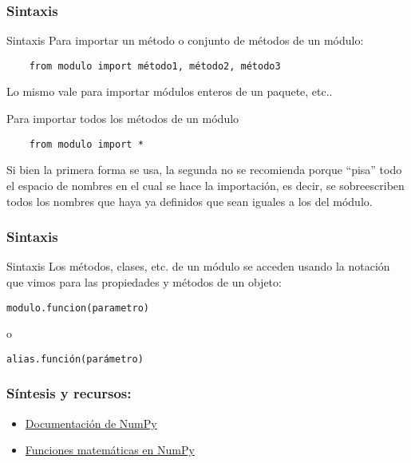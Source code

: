 \documentclass{beamer}
\begin{document}
\begin{frame}[fragile]
    \frametitle{Sintaxis}
    \begin{block}{Sintaxis}
    Para importar un método o conjunto de métodos de un módulo:
    \begin{verbatim}
    from modulo import método1, método2, método3
    \end{verbatim}
    Lo mismo vale para importar módulos enteros de un paquete, etc..

    Para importar todos los métodos de un módulo
    \begin{verbatim}
    from modulo import *
    \end{verbatim}
    Si bien la primera forma se usa, la segunda no se recomienda porque ``pisa'' todo el espacio
    de nombres en el cual se hace la importación, es decir, se sobreescriben todos los nombres que haya ya
    definidos que sean iguales a los del módulo.
    \end{block}
    \end{frame}

\begin{frame}[fragile]
\frametitle{Sintaxis}
\begin{block}{Sintaxis}
Los métodos, clases, etc. de un módulo se acceden usando la notación que vimos para las propiedades y métodos de un objeto:
\begin{verbatim}
modulo.funcion(parametro)
\end{verbatim}
o
\begin{verbatim}
alias.función(parámetro)
\end{verbatim}
\end{block}
\end{frame}

\begin{frame}
\frametitle{Síntesis y recursos:}

\begin{itemize}
\item \href{https://numpy.org/doc/stable/}{Documentación de NumPy}
\item \href{https://numpy.org/doc/stable/reference/routines.math.html}{Funciones matemáticas en NumPy}

\end{itemize}
\end{frame}
\end{document}
